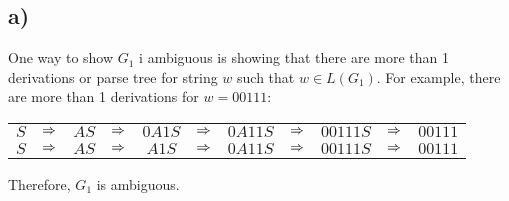 \subsection*{a)}


One way to show $G_1$ i ambiguous is showing that there are more than 1 derivations or parse tree for string $w$ such that $w \in L(G_1)$. For example, there are more than 1 derivations for $w = 00111$:
\begin{table}[ht]
  \centering
  \begin{tabular}{ccccccccccc}
    $S$ & $\Rightarrow$ & $AS$ & $\Rightarrow$ & $0A1S$ & $\Rightarrow$ & $0A11S$ & $\Rightarrow$ & $00111S$ & $\Rightarrow$ & $00111$\\
    $S$ & $\Rightarrow$ & $AS$ & $\Rightarrow$ & $A1S$ & $\Rightarrow$ & $0A11S$ & $\Rightarrow$ & $00111S$ & $\Rightarrow$ & $00111$\\
  \end{tabular}
\end{table}

Therefore, $G_1$ is ambiguous.
